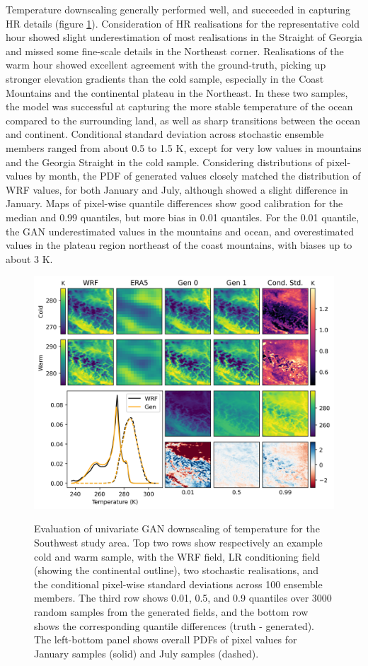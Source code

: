\documentclass{ametsocV6.1}
\begin{document}
Temperature downscaling generally performed well, and succeeded in capturing HR details (figure \ref{temperature}). Consideration of HR realisations for the representative cold hour showed slight underestimation of most realisations in the Straight of Georgia and missed some fine-scale details in the Northeast corner. Realisations of the warm hour showed excellent agreement with the ground-truth, picking up stronger elevation gradients than the cold sample, especially in the Coast Mountains and the continental plateau in the Northeast. In these two samples, the model was successful at capturing the more stable temperature of the ocean compared to the surrounding land, as well as sharp transitions between the ocean and continent. Conditional standard deviation across stochastic ensemble members ranged from about 0.5 to 1.5 K, except for very low values in mountains and the Georgia Straight in the cold sample. Considering distributions of pixel-values by month, the PDF of generated values closely matched the distribution of WRF values, for both January and July, although showed a slight difference in January. Maps of pixel-wise quantile differences show good calibration for the median and 0.99 quantiles, but more bias in 0.01 quantiles. For the 0.01 quantile, the GAN underestimated values in the mountains and ocean, and overestimated values in the plateau region northeast of the coast mountains, with biases up to about 3 K. 
\begin{figure}[H]
  \noindent\includegraphics[width=\textwidth,angle=0]{final/Temperature_Fig.png}\\
  \caption{Evaluation of univariate GAN downscaling of temperature for the Southwest study area. Top two rows show respectively an example cold and warm sample, with the WRF field, LR conditioning field (showing the continental outline), two stochastic realisations, and the conditional pixel-wise standard deviations across 100 ensemble members. The third row shows 0.01, 0.5, and 0.9 quantiles over 3000 random samples from the generated fields, and the bottom row shows the corresponding quantile differences (truth - generated). The left-bottom panel shows overall PDFs of pixel values for January samples (solid) and July samples (dashed).}\label{temperature}
\end{figure}
\end{document}

